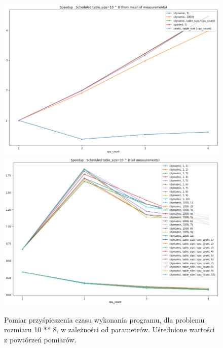 \documentclass{article}
\begin{document}
        \begin{figure}[h!]
            \centering
            \includegraphics[width=17cm]{report2/images/TableSize/ex3_tb8_speedup.png}
            \includegraphics[width=17cm]{report2/images/TableSize/ex3_tb8_speedup_all.png}
            \caption{Pomiar przyśpieszenia czasu wykonania programu, dla problemu rozmiaru 10 ** 8, w zależności od parametrów. Uśrednione wartości z powtórzeń pomiarów. }
        \end{figure}


        \newpage
\end{document}
